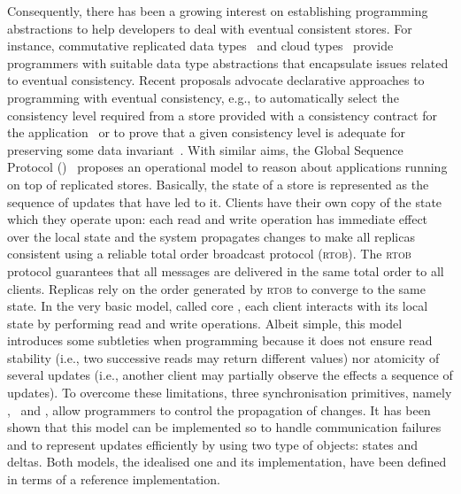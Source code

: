 Consequently,  there has been a growing interest on establishing  programming abstractions to help developers 
to deal with eventual consistent stores. For instance, commutative replicated data types~\cite{DBLP:conf/sss/ShapiroPBZ11}  and 
cloud types~\cite{burckhardt2012cloud} provide programmers with suitable data type abstractions that encapsulate issues related 
to eventual consistency. Recent proposals advocate declarative approaches to 
 programming with eventual consistency,  e.g.,  
to automatically select the consistency level required from a store provided with 
a consistency contract for the application~\cite{sivaramakrishnan2015declarative}
or to prove that  a given consistency level is adequate for preserving some data invariant~\cite{gotsman2016cause}.
With similar aims,
the Global Sequence Protocol (\gsp)~\cite{DBLP:conf/ecoop/BurckhardtLPF15} proposes  an operational model  
 to reason about applications 
running on top of replicated stores. Basically, the state of a store is represented as the sequence of updates that 
have led to it. Clients have their own copy of the state which they operate upon: each read and write operation has immediate
effect over the local state and the system propagates changes to make all replicas consistent using 
a reliable total order broadcast  protocol (\textsc{rtob}). The \textsc{rtob} protocol guarantees that all messages
are delivered  in the same total order to all clients. Replicas rely on the order generated  by \textsc{rtob} to 
converge to the same state. In the very basic model, called core \gsp, each client interacts with its local state 
  by performing read and write operations. Albeit simple, this model  introduces some subtleties when programming 
  because  it does not ensure read stability (i.e., two successive reads may 
return different values) nor atomicity of several updates (i.e., another client may partially observe the effects  
a sequence of updates). To overcome these limitations, 
 three synchronisation primitives, namely \pullcmd, \pushcmd\ and \confcmd, 
 allow programmers to control the propagation of changes. %
It has been shown that this model can be implemented so to handle communication
failures and to represent updates efficiently by using two type of objects: states and deltas.
Both models, \ie the idealised one and its implementation,
have been defined in terms of a reference implementation. 

